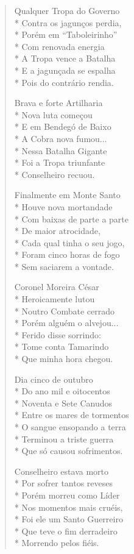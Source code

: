 \begin{verse}
Qualquer Tropa do Governo\\*
Contra os jagunços perdia,\\*
Porém em ``Taboleirinho''\\*
Com renovada energia\\*
A Tropa vence a Batalha\\*
E a jagunçada se espalha\\*
Pois do contrário rendia.

Brava e forte Artilharia\\*
Nova luta começou\\*
E em Bendegó de Baixo\\*
A Cobra nova fumou...\\*
Nessa Batalha Gigante\\*
Foi a Tropa triunfante\\*
Conselheiro recuou.

Finalmente em Monte Santo\\*
Houve nova mortandade\\*
Com baixas de parte a parte\\*
De maior atrocidade,\\*
Cada qual tinha o seu jogo,\\*
Foram cinco horas de fogo\\*
Sem saciarem a vontade.

Coronel Moreira César\\*
Heroicamente lutou\\*
Noutro Combate cerrado\\*
Porém alguém o alvejou...\\*
Ferido disse sorrindo:\\*
Tome conta Tamarindo\\*
Que minha hora chegou.

Dia cinco de outubro\\*
Do ano mil e oitocentos\\*
Noventa e Sete Canudos\\*
Entre os mares de tormentos\\*
O sangue ensopando a terra\\*
Terminou a triste guerra\\*
Que só causou sofrimentos.

Conselheiro estava morto\\*
Por sofrer tantos reveses\\*
Porém morreu como Líder\\*
Nos momentos mais cruéis,\\*
Foi ele um Santo Guerreiro\\*
Que teve o fim derradeiro\\*
Morrendo pelos fiéis.


\end{verse}
